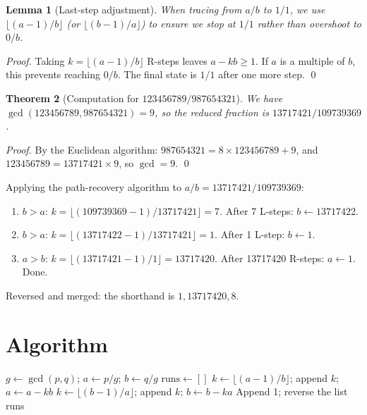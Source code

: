 \documentclass[11pt]{article}
\newtheorem{theorem}{Theorem}
\newtheorem{lemma}[theorem]{Lemma}
\begin{document}
\begin{lemma}[Last-step adjustment]
When tracing from $a/b$ to $1/1$, we use $\lfloor (a-1)/b \rfloor$ (or $\lfloor (b-1)/a \rfloor$) to ensure we stop at $1/1$ rather than overshoot to $0/b$.
\end{lemma}

\begin{proof}
Taking $k = \lfloor (a-1)/b \rfloor$ R-steps leaves $a - kb \geq 1$. If $a$ is a multiple of $b$, this prevents reaching $0/b$. The final state is $1/1$ after one more step. \qed
\end{proof}

\begin{theorem}[Computation for $123456789/987654321$]
We have $\gcd(123456789, 987654321) = 9$, so the reduced fraction is $13717421/109739369$.
\end{theorem}

\begin{proof}
By the Euclidean algorithm: $987654321 = 8 \times 123456789 + 9$, and $123456789 = 13717421 \times 9$, so $\gcd = 9$. \qed
\end{proof}

Applying the path-recovery algorithm to $a/b = 13717421/109739369$:

\begin{enumerate}
    \item $b > a$: $k = \lfloor(109739369 - 1)/13717421\rfloor = 7$. After 7 L-steps: $b \leftarrow 13717422$.
    \item $b > a$: $k = \lfloor(13717422 - 1)/13717421\rfloor = 1$. After 1 L-step: $b \leftarrow 1$.
    \item $a > b$: $k = \lfloor(13717421 - 1)/1\rfloor = 13717420$. After 13717420 R-steps: $a \leftarrow 1$. Done.
\end{enumerate}

Reversed and merged: the shorthand is $1, 13717420, 8$.

\section{Algorithm}

\begin{algorithmic}[1]
    \State $g \gets \gcd(p, q)$; $a \gets p/g$; $b \gets q/g$
    \State $\text{runs} \gets []$
            \State $k \gets \lfloor(a-1)/b\rfloor$; append $k$; $a \gets a - kb$
        \Else
            \State $k \gets \lfloor(b-1)/a\rfloor$; append $k$; $b \gets b - ka$
        \EndIf
    \EndWhile
    \State Append 1; reverse the list
    \State \Return runs
\EndFunction
\end{algorithmic}
\end{document}
